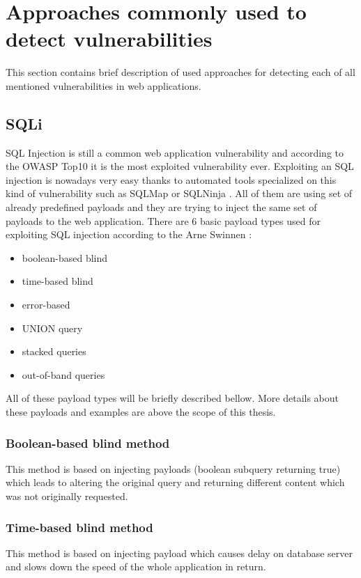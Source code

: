 	\section{Approaches commonly used to detect vulnerabilities}\label{approaches}
	
		This section contains brief description of used approaches for detecting each of all mentioned vulnerabilities in web applications.
	
		\subsection{SQLi}

		SQL Injection is still a common web application vulnerability and according to the OWASP Top10 it is the most exploited vulnerability ever. Exploiting an SQL injection is nowadays very easy thanks to automated tools specialized on this kind of vulnerability such as SQLMap \cite{SQLMAP} or SQLNinja \cite{SQLNINJA}. All of them are using set of already predefined payloads and they are trying to inject the same set of payloads to the web application. There are 6 basic payload types used for exploiting SQL injection according to the Arne Swinnen \cite{AutomatedSQLi}:
		
		\begin{itemize}
			\item boolean-based blind
			\item time-based blind
			\item error-based
			\item UNION query
			\item stacked queries
			\item out-of-band queries
		\end{itemize}
		
		
		All of these payload types will be briefly described bellow. More details about these payloads and examples are above the scope of this thesis.
		
			\subsubsection{Boolean-based blind method}
			This method is based on injecting payloads (boolean subquery returning true) which leads to altering the original query and returning different content which was not originally requested.
		
			\subsubsection{Time-based blind method}
			This method is based on injecting payload which causes delay on database server and slows down the speed of the whole application in return.
		
